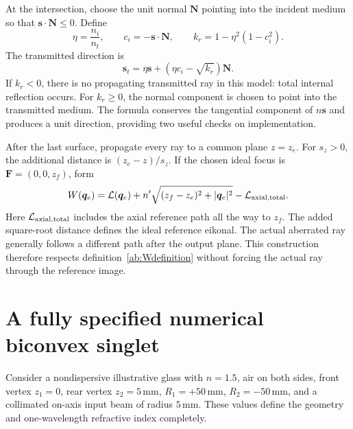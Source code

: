 At the intersection, choose the unit normal $\bm N$ pointing into the
incident medium so that $\bm s\cdot\bm N\leq0$. Define
\begin{equation}
 \eta=\frac{n_i}{n_t},\qquad
 c_i=-\bm s\cdot\bm N,\qquad
 k_r=1-\eta^2(1-c_i^2).
\end{equation}
The transmitted direction is
\begin{equation}
 \boxed{\bm s_t=\eta\bm s+
            \left(\eta c_i-\sqrt{k_r}\right)\bm N.}
 \label{ab:vectorSnell}
\end{equation}
If $k_r<0$, there is no propagating transmitted ray in this model: total
internal reflection occurs. For $k_r\geq0$, the normal component is chosen
to point into the transmitted medium. The formula conserves the tangential
component of $n\bm s$ and produces a unit direction, providing two useful
checks on implementation.

After the last surface, propagate every ray to a common plane $z=z_e$.
For $s_z>0$, the additional distance is $(z_e-z)/s_z$. If the chosen ideal
focus is $\bm F=(0,0,z_f)$, form
\begin{equation}
 W(\bm q_e)=\mathcal L(\bm q_e)
       +n'\sqrt{(z_f-z_e)^2+|\bm q_e|^2}-\mathcal L_{\rm axial,total}.
 \label{ab:traceW}
\end{equation}
Here $\mathcal L_{\rm axial,total}$ includes the axial reference path all the
way to $z_f$. The added square-root distance defines the ideal reference
eikonal. The actual aberrated ray generally follows a different path after
the output plane. This construction therefore respects
definition~\eqref{ab:Wdefinition} without forcing the actual ray through the
reference image.

\section{A fully specified numerical biconvex singlet}
Consider a nondispersive illustrative glass with $n=1.5$, air on both sides,
front vertex $z_1=0$, rear vertex $z_2=5\,\mathrm{mm}$,
$R_1=+50\,\mathrm{mm}$, $R_2=-50\,\mathrm{mm}$, and a collimated
on-axis input beam of radius $5\,\mathrm{mm}$. These values define the
geometry and one-wavelength refractive index completely.

